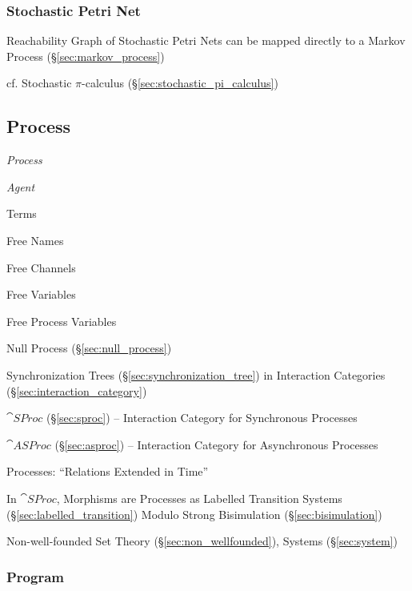 \subsubsection{Stochastic Petri Net}\label{sec:stochastic_petri_net}

Reachability Graph of Stochastic Petri Nets can be mapped directly to
a Markov Process (\S\ref{sec:markov_process})

\fist cf. Stochastic $\pi$-calculus (\S\ref{sec:stochastic_pi_calculus})



\subsection{Process}\label{sec:process}

\emph{Process}

\emph{Agent}

Terms

Free Names

Free Channels

Free Variables

Free Process Variables

Null Process (\S\ref{sec:null_process})


\asterism


Synchronization Trees (\S\ref{sec:synchronization_tree}) in
Interaction Categories (\S\ref{sec:interaction_category})

$\cat{SProc}$ (\S\ref{sec:sproc}) -- Interaction Category for
Synchronous Processes

$\cat{ASProc}$ (\S\ref{sec:asproc}) -- Interaction Category for
Asynchronous Processes

Processes: ``Relations Extended in Time''

In $\cat{SProc}$, Morphisms are Processes as Labelled Transition
Systems (\S\ref{sec:labelled_transition}) Modulo Strong Bisimulation
(\S\ref{sec:bisimulation})

Non-well-founded Set Theory (\S\ref{sec:non_wellfounded}), Systems
(\S\ref{sec:system})



\subsubsection{Program}\label{sec:program}

